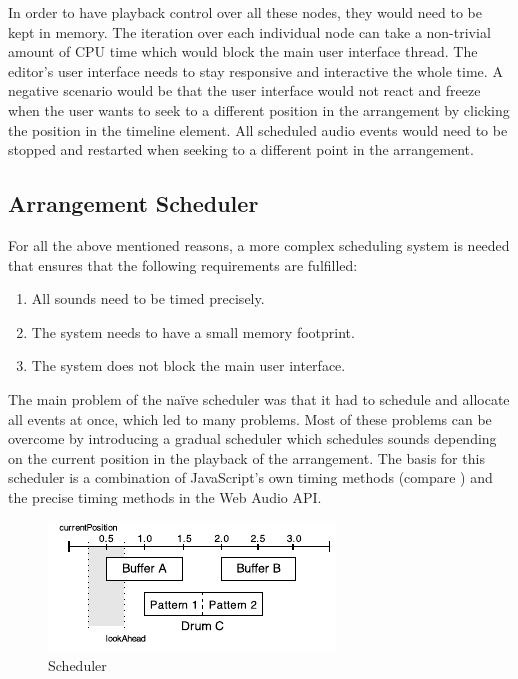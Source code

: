 In order to have playback control over all these nodes, they would need to be kept in memory. The iteration over each individual node can take a non-trivial amount of CPU time which would block the main user interface thread. The editor's user interface needs to stay responsive and interactive the whole time. A negative scenario would be that the user interface would not react and freeze when the user wants to seek to a different position in the arrangement by clicking the position in the timeline element. All scheduled audio events would need to be stopped and restarted when seeking to a different point in the arrangement.

\subsection{Arrangement Scheduler}

For all the above mentioned reasons, a more complex scheduling system is needed that ensures that the following requirements are fulfilled:

\begin{enumerate}
  \item All sounds need to be timed precisely.
  \item The system needs to have a small memory footprint.
  \item The system does not block the main user interface.
\end{enumerate}

The main problem of the na\"ive scheduler was that it had to schedule and allocate all events at once, which led to many problems. Most of these problems can be overcome by introducing a gradual scheduler which schedules sounds depending on the current position in the playback of the arrangement. The basis for this scheduler is a combination of JavaScript's own timing methods (compare ) and the precise timing methods in the Web Audio API.

\begin{figure}[htb]
  \centerline{\includegraphics[width=0.9\linewidth]{images/Scheduler_Example.pdf}}
  \caption[Scheduler]{Scheduler}
  \label{fig:scheduler}
\end{figure}

